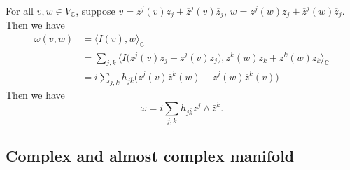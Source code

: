 \documentclass{ctexart}
\begin{document}

For all $v,w\in V_\mathbb{C}$, suppose $v=z^j(v)z_j+\overline{z}^j(v)\overline{z}_j$, $w=z^j(w)z_j+\overline{z}^j(w)\overline{z}_j$. Then we have
$$
\begin{aligned}
  \omega(v,w)
    &=\langle I(v),\overline{w}\rangle_\mathbb{C} \\
    &=\sum_{j, k}\langle I\big(z^j(v)z_j+\overline{z}^j(v)\overline{z}_j\big),z^k(w)z_k+\overline{z}^k(w)\overline{z}_k\rangle_\mathbb{C} \\
    &=i \sum_{j, k}h_{j\bar{k}}\big(z^j(v)\overline{z}^k(w)-z^j(w)\overline{z}^k(v)\big)
\end{aligned}
$$
Then we have
$$
\omega=i \sum_{j, k}h_{j \bar{k}} z^{j} \wedge \bar{z}^{k}.
$$



\subsection*{Complex and almost complex manifold}
\end{document}
